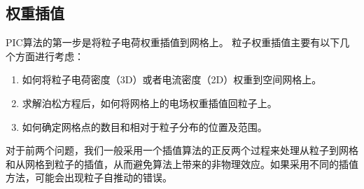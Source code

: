 \subsection{权重插值}
PIC算法的第一步是将粒子电荷权重插值到网格上。
粒子权重插值主要有以下几个方面进行考虑：

\begin{enumerate}
  \item 如何将粒子电荷密度（3D）或者电流密度（2D）权重到空间网格上。
  \item 求解泊松方程后，如何将网格上的电场权重插值回粒子上。
  \item 如何确定网格点的数目和相对于粒子分布的位置及范围。
\end{enumerate}

对于前两个问题，我们一般采用一个插值算法的正反两个过程来处理从粒子到网格和从网格到粒子的插值，从而避免算法上带来的非物理效应。如果采用不同的插值方法，可能会出现粒子自推动的错误。

